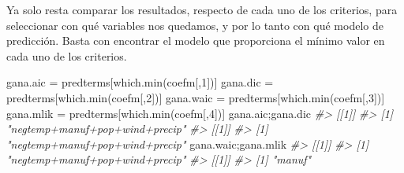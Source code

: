 \documentclass[
]{book}
\newenvironment{Shaded}{\begin{snugshade}}{\end{snugshade}}
\newcommand{\AttributeTok}[1]{\textcolor[rgb]{0.77,0.63,0.00}{#1}}
\newcommand{\CommentTok}[1]{\textcolor[rgb]{0.56,0.35,0.01}{\textit{#1}}}
\newcommand{\ConstantTok}[1]{\textcolor[rgb]{0.00,0.00,0.00}{#1}}
\newcommand{\ControlFlowTok}[1]{\textcolor[rgb]{0.13,0.29,0.53}{\textbf{#1}}}
\newcommand{\DecValTok}[1]{\textcolor[rgb]{0.00,0.00,0.81}{#1}}
\newcommand{\FunctionTok}[1]{\textcolor[rgb]{0.00,0.00,0.00}{#1}}
\newcommand{\NormalTok}[1]{#1}
\newcommand{\OtherTok}[1]{\textcolor[rgb]{0.56,0.35,0.01}{#1}}
\newcommand{\SpecialCharTok}[1]{\textcolor[rgb]{0.00,0.00,0.00}{#1}}
\newcommand{\StringTok}[1]{\textcolor[rgb]{0.31,0.60,0.02}{#1}}
\begin{document}
\begin{Shaded}
\end{Shaded}

Ya solo resta comparar los resultados, respecto de cada uno de los criterios, para seleccionar con qué variables nos quedamos, y por lo tanto con qué modelo de predicción. Basta con encontrar el modelo que proporciona el mínimo valor en cada uno de los criterios.

\begin{Shaded}
\begin{Highlighting}[]
\NormalTok{gana.aic }\OtherTok{=}\NormalTok{ predterms[}\FunctionTok{which.min}\NormalTok{(coefm[,}\DecValTok{1}\NormalTok{])]}
\NormalTok{gana.dic }\OtherTok{=}\NormalTok{ predterms[}\FunctionTok{which.min}\NormalTok{(coefm[,}\DecValTok{2}\NormalTok{])]}
\NormalTok{gana.waic }\OtherTok{=}\NormalTok{ predterms[}\FunctionTok{which.min}\NormalTok{(coefm[,}\DecValTok{3}\NormalTok{])]}
\NormalTok{gana.mlik }\OtherTok{=}\NormalTok{ predterms[}\FunctionTok{which.min}\NormalTok{(coefm[,}\DecValTok{4}\NormalTok{])]}
\NormalTok{gana.aic;gana.dic}
\CommentTok{\#\textgreater{} [[1]]}
\CommentTok{\#\textgreater{} [1] "negtemp+manuf+pop+wind+precip"}
\CommentTok{\#\textgreater{} [[1]]}
\CommentTok{\#\textgreater{} [1] "negtemp+manuf+pop+wind+precip"}
\NormalTok{gana.waic;gana.mlik}
\CommentTok{\#\textgreater{} [[1]]}
\CommentTok{\#\textgreater{} [1] "negtemp+manuf+pop+wind+precip"}
\CommentTok{\#\textgreater{} [[1]]}
\CommentTok{\#\textgreater{} [1] "manuf"}
\end{Highlighting}
\end{Shaded}
\end{document}
